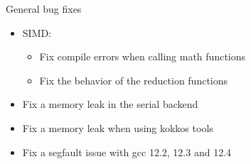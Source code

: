 \begin{frame}[fragile]{General bug fixes}
  \begin{itemize}
    \item SIMD:
    \begin{itemize}
      \item Fix compile errors when calling math functions
      \item Fix the behavior of the reduction functions
    \end{itemize}
    \item Fix a memory leak in the serial backend
    \item Fix a memory leak when using kokkos tools
    \item Fix a segfault issue with gcc 12.2, 12.3 and 12.4
  \end{itemize}
\end{frame}

